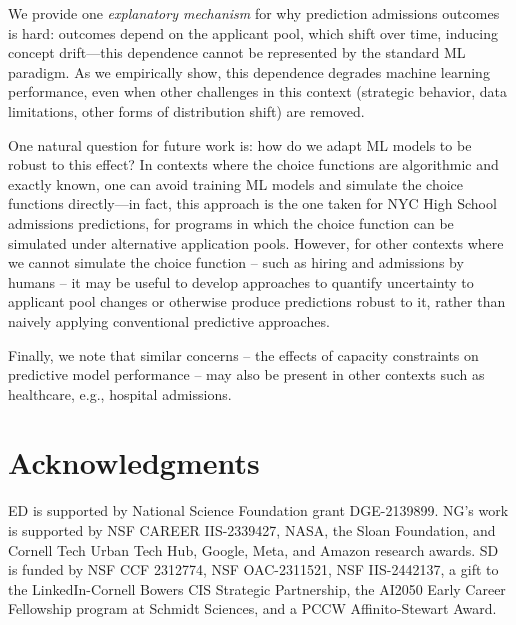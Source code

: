 \documentclass[letterpaper]{article}
\begin{document}
We provide one \textit{explanatory mechanism} for why prediction admissions outcomes is hard: outcomes depend on the applicant pool, which shift over time, inducing concept drift---this dependence cannot be represented by the standard ML paradigm. As we empirically show, this dependence degrades machine learning performance, even when other challenges in this context (strategic behavior, data limitations, other forms of distribution shift) are removed.

One natural question for future work is: how do we adapt ML models to be robust to this effect? In contexts where the choice functions are algorithmic and exactly known, one can avoid training ML models and simulate the choice functions directly---in fact, this approach is the one taken for NYC High School admissions predictions, for programs in which the choice function can be simulated under alternative application pools. However, for other contexts where we cannot simulate the choice function -- such as hiring and admissions by humans -- it may be useful to develop approaches to quantify uncertainty to applicant pool changes or otherwise produce predictions robust to it, rather than naively applying conventional predictive approaches.

Finally, we note that similar concerns -- the effects of capacity constraints on predictive model performance -- may also be present in other contexts such as healthcare, e.g., hospital admissions.

\section*{Acknowledgments}
ED is supported by National Science Foundation grant DGE-2139899. NG's work is supported by NSF CAREER IIS-2339427, NASA, the Sloan Foundation, and Cornell Tech Urban Tech Hub, Google, Meta, and Amazon research awards. SD is funded by NSF CCF 2312774, NSF OAC-2311521, NSF IIS-2442137, a gift to the LinkedIn-Cornell Bowers CIS Strategic Partnership, the AI2050 Early Career Fellowship program at Schmidt Sciences, and a PCCW Affinito-Stewart Award.

\FloatBarrier



\appendix


\end{document}

